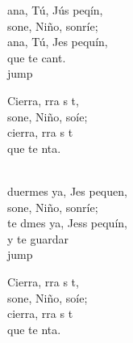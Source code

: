 \begin{cancion}[Nana][]%
	ana, Tú, Jús peqín, \\
	sone, Niño, sonríe; \\
	ana, Tú, Jes pequín, \\
	que  te cant. \\jump\\
	\begin{chorus}%
	Cierra, rra s t,\\
	sone, Niño, soíe;\\
	cierra, rra s t\\
	que te nta.\\
	\end{chorus}%
	\jump\\
	duermes ya, Jes pequen,  \\
	sone, Niño, sonríe; \\
	te dmes ya, Jess pequín,\\
	y  te guardar\\jump\\
	\begin{chorus}%
	Cierra, rra s t,\\
	sone, Niño, soíe;\\
	cierra, rra s t\\
	que te nta.\\
	\end{chorus}%
	\jump\\
\end{cancion}%
